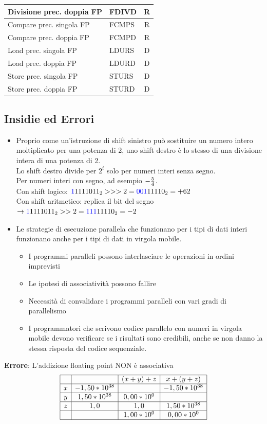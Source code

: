 \documentclass[12pt,a4paper]{article}
\begin{document}
\begin{longtable}{|l|l|c|}
Divisione prec. doppia FP          & FDIVD  & R  \\ \hline
Compare prec. singola FP           & FCMPS  & R  \\ \hline
Compare prec. doppia FP            & FCMPD  & R  \\ \hline
Load prec. singola FP              & LDURS  & D  \\ \hline
Load prec. doppia FP               & LDURD  & D  \\ \hline
Store prec. singola FP             & STURS  & D  \\ \hline
Store prec. doppia FP              & STURD  & D  \\ \hline
\end{longtable}

\subsection{Insidie ed Errori}
\begin{itemize}
\item Proprio come un'istruzione di shift sinistro può sostituire un numero intero moltiplicato per una potenza di 2, uno shift destro è lo stesso di una divisione intera di una potenza di 2.\\
Lo shift destro divide per $2^i$ solo per numeri interi senza segno.\\
Per numeri interi con segno, ad esempio $-{5\over4}$.\\
Con shift logico: $\textcolor{blue}{1}1111011_2 >>> 2 = \textcolor{blue}{001}11110_2 = +62$\\
Con shift aritmetico: replica il bit del segno $\rightarrow \textcolor{blue}{1}1111011_2 >> 2 = \textcolor{blue}{111}11110_2 = -2$
\item Le strategie di esecuzione parallela che funzionano per i tipi di dati interi funzionano anche per i tipi di dati in virgola mobile.
\begin{itemize}
\item I programmi paralleli possono interlasciare le operazioni in ordini imprevisti
\item Le ipotesi di associatività possono fallire
\item Necessità di convalidare i programmi paralleli con vari gradi di parallelismo
\item I programmatori che scrivono codice parallelo con numeri in virgola mobile devono verificare se i risultati sono credibili, anche se non danno la stessa risposta del codice sequenziale.
\end{itemize}
\end{itemize}
\textbf{Errore}: L'addizione floating point NON è associativa
$$\begin{array}{|c|c|c|c|}
\hline
 & & (x+y)+z & x+(y+z)\\ \hline
 x & -1,50 * 10^{38} & & -1,50 * 10^{38}\\ \hline
 y & 1,50 * 10^{38} & 0,00 * 10^0 & \\ \hline
 z & 1,0 & 1,0 & 1,50 * 10^{38}\\ \hline
 & & 1,00 * 10^{0} & 0,00 * 10^{0}\\ \hline
\end{array}$$
\end{document}

